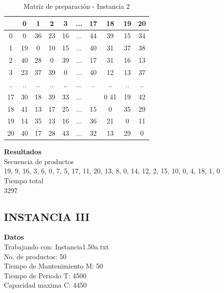 \documentclass[twocolumn,10pt]{article}
\begin{document}
\begin{table}[H]
\centering
\begin{tabular}{||c c c c c c c c c c||} 
 \hline
  &0 &  1 &  2 &  3  & ... & 17  & 18 &  19  & 20\\
\hline
    
0  &  0 & 36 & 23 & 16  &... & 44 & 39 & 15 & 34\\
1  & 19  & 0 & 10  &15  &...  &40 & 31 & 37 & 38\\
2  & 40 & 28 &  0  &39  &... & 17 & 31 & 16 & 13\\
3  & 23 & 37 & 39 &  0 & ... & 40 & 12 & 13 & 37\\
.. & ..  &.. & ..&  ..&  ... & ..  &..&  .. & ..\\
17 & 30 & 18 & 39  &33 & ... & & 0  41 & 19 & 42\\
18 & 41 & 13 & 17  &25 & ... & 15 &  0&  35 & 29\\
19 & 14 & 35 & 13&  16 & ... & 36&  21  & 0 & 11\\
20  &40 & 17 & 28&  43 & ... & 32 & 13 &29  & 0\\
\hline

\end{tabular}
\caption{Matriz de preparación - Instancia 2}
\label{table:1}
\end{table}

\textbf{Resultados}\\
Secuencia de productos\\
19, 9, 16, 3, 6, 0, 7, 5, 17, 11, 20, 13, 8, 0, 14, 12, 2, 15, 10, 0, 4, 18, 1, 0\\
Tiempo total\\
3297





\subsection{INSTANCIA III}


\textbf{Datos}\\
Trabajando con:  Instancia1.50a.txt\\
No. de productos: 50\\
Tiempo de Mantenimiento M: 50\\
Tiempo de Periodo T: 4500\\
Capacidad maxima C: 4450\\
\end{document}
